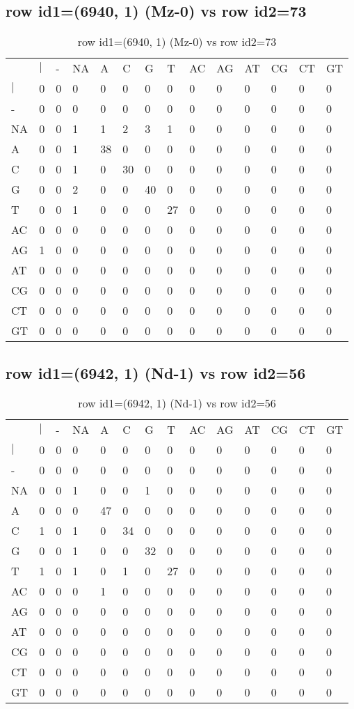 \subsection{row id1=(6940, 1) (Mz-0) vs row id2=73}
\begin{center}
\begin{longtable}{|l|l|l|l|l|l|l|l|l|l|l|l|l|l|}
\caption{row id1=(6940, 1) (Mz-0) vs row id2=73} \label{table_dm142}\\
\hline
\\
\hline
&$|$&-&NA&A&C&G&T&AC&AG&AT&CG&CT&GT\\
$|$&0&0&0&0&0&0&0&0&0&0&0&0&0\\
-&0&0&0&0&0&0&0&0&0&0&0&0&0\\
NA&0&0&1&1&2&3&1&0&0&0&0&0&0\\
A&0&0&1&38&0&0&0&0&0&0&0&0&0\\
C&0&0&1&0&30&0&0&0&0&0&0&0&0\\
G&0&0&2&0&0&40&0&0&0&0&0&0&0\\
T&0&0&1&0&0&0&27&0&0&0&0&0&0\\
AC&0&0&0&0&0&0&0&0&0&0&0&0&0\\
AG&1&0&0&0&0&0&0&0&0&0&0&0&0\\
AT&0&0&0&0&0&0&0&0&0&0&0&0&0\\
CG&0&0&0&0&0&0&0&0&0&0&0&0&0\\
CT&0&0&0&0&0&0&0&0&0&0&0&0&0\\
GT&0&0&0&0&0&0&0&0&0&0&0&0&0\\
\hline
\end{longtable}
\end{center}

\subsection{row id1=(6942, 1) (Nd-1) vs row id2=56}
\begin{center}
\begin{longtable}{|l|l|l|l|l|l|l|l|l|l|l|l|l|l|}
\caption{row id1=(6942, 1) (Nd-1) vs row id2=56} \label{table_dm144}\\
\hline
\\
\hline
&$|$&-&NA&A&C&G&T&AC&AG&AT&CG&CT&GT\\
$|$&0&0&0&0&0&0&0&0&0&0&0&0&0\\
-&0&0&0&0&0&0&0&0&0&0&0&0&0\\
NA&0&0&1&0&0&1&0&0&0&0&0&0&0\\
A&0&0&0&47&0&0&0&0&0&0&0&0&0\\
C&1&0&1&0&34&0&0&0&0&0&0&0&0\\
G&0&0&1&0&0&32&0&0&0&0&0&0&0\\
T&1&0&1&0&1&0&27&0&0&0&0&0&0\\
AC&0&0&0&1&0&0&0&0&0&0&0&0&0\\
AG&0&0&0&0&0&0&0&0&0&0&0&0&0\\
AT&0&0&0&0&0&0&0&0&0&0&0&0&0\\
CG&0&0&0&0&0&0&0&0&0&0&0&0&0\\
CT&0&0&0&0&0&0&0&0&0&0&0&0&0\\
GT&0&0&0&0&0&0&0&0&0&0&0&0&0\\
\hline
\end{longtable}
\end{center}

